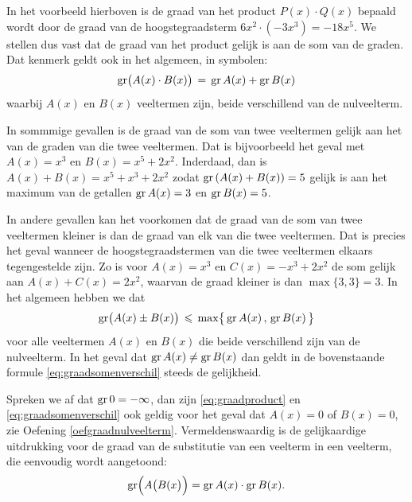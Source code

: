 \documentclass{ximera}
\begin{document}
In het voorbeeld hierboven is de graad van het product $P(x) \cdot Q(x)$ bepaald wordt door de graad van de hoogstegraadsterm $6x^2 \cdot (-3x^3) = -18 x^{5}$. We stellen dus vast dat de graad van het product gelijk is aan de som van de graden. Dat kenmerk geldt ook in het algemeen, in symbolen: 
\begin{equation} \label{eq:graadproduct}
\operatorname{gr}\bigl( A(x) \cdot B(x) \bigr) \, = \, \operatorname{gr} A(x) + \operatorname{gr} B(x)
\end{equation}
waarbij $A(x)$ en $B(x)$ veeltermen zijn, beide verschillend van de nulveelterm. 

In sommmige gevallen is de graad van de som van twee veeltermen gelijk aan het  van de graden van die twee veeltermen. Dat is bijvoorbeeld het geval met 
$A(x) = x^3$ en $B(x) = x^5 + 2x^2$. Inderdaad, dan is $A(x) + B(x) = x^5 + x^3 + 2x^2$ zodat $\operatorname{gr}\left(A(x) + B(x)\right) = 5$ gelijk is aan het maximum van de getallen $\operatorname{gr} A(x) = 3$ en $\operatorname{gr} B(x) = 5$. %

In andere gevallen kan het voorkomen dat de graad van de som van twee veeltermen kleiner is dan de graad van elk van die twee veeltermen. Dat is precies het geval wanneer de hoogste\-graadstermen van die twee veeltermen elkaars tegengestelde zijn. Zo is voor $A(x) = x^3$ en $C(x) = -x^3 + 2x^2$ de som gelijk aan $A(x) + C(x) = 2x^2$, waarvan de graad kleiner is dan $\max\{3,3\} = 3$. In het algemeen hebben we dat  
\begin{equation} \label{eq:graadsomenverschil}
\operatorname{gr}\bigl( A(x) \pm B(x) \bigr) \, \leqslant \, \max \bigl\{ \,\operatorname{gr} A(x)\, , \, \operatorname{gr} B(x) \, \bigr\}
\end{equation}
voor alle veeltermen $A(x)$ en $B(x)$ die beide verschillend zijn van de nulveelterm. In het geval dat $\operatorname{gr} A(x) \neq \operatorname{gr} B(x)$ dan geldt in de bovenstaande formule \eqref{eq:graadsomenverschil} steeds de gelijkheid. 

\begin{Uitbreiding}
Spreken we af dat $\operatorname{gr} 0 = - \infty$, dan zijn \eqref{eq:graadproduct} en \eqref{eq:graadsomenverschil} ook geldig voor het geval dat $A(x) = 0$ of $B(x) = 0$, zie Oefening \ref{oefgraadnulveelterm}. Vermeldenswaardig is de gelijkaardige uitdrukking voor de graad van de substitutie van een veelterm in een veelterm, die eenvoudig wordt aangetoond:
\[
\operatorname{gr}\Bigl(A\bigl(B(x\bigr)\Bigr) = \operatorname{gr} A(x) \cdot \operatorname{gr} B(x).
\]
\end{Uitbreiding}
\end{document}
